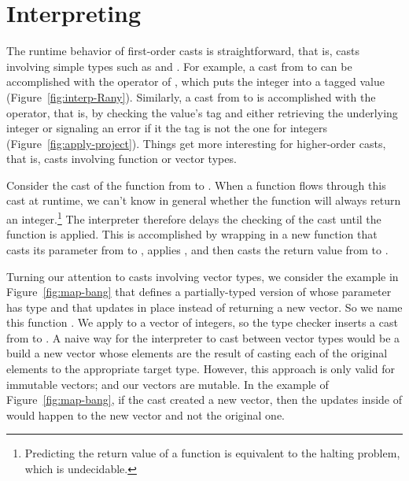 \documentclass[7x10]{TimesAPriori_MIT}%
\begin{document}
\clearpage

\section{Interpreting \LangCast{}}
\label{sec:interp-casts}

The runtime behavior of first-order casts is straightforward, that is,
casts involving simple types such as  and
.  For example, a cast from  to 
can be accomplished with the  operator of \LangAny{}, which
puts the integer into a tagged value
(Figure~\ref{fig:interp-Rany}). Similarly, a cast from  to
 is accomplished with the  operator, that
is, by checking the value's tag and either retrieving the underlying
integer or signaling an error if it the tag is not the one for
integers (Figure~\ref{fig:apply-project}).
%
Things get more interesting for higher-order casts, that is, casts
involving function or vector types.

Consider the cast of the function  from  to . When a function flows through
this cast at runtime, we can't know in general whether the function
will always return an integer.\footnote{Predicting the return value of
  a function is equivalent to the halting problem, which is
  undecidable.}  The \LangCast{} interpreter therefore delays the checking
of the cast until the function is applied. This is accomplished by
wrapping  in a new function that casts its parameter
from  to , applies , and then
casts the return value from  to .

Turning our attention to casts involving vector types, we consider the
example in Figure~\ref{fig:map-bang} that defines a
partially-typed version of  whose parameter  has
type  and that updates  in place
instead of returning a new vector. So we name this function
. We apply  to a vector of integers, so
the type checker inserts a cast from 
to . A naive way for the \LangCast{} interpreter to
cast between vector types would be a build a new vector whose elements
are the result of casting each of the original elements to the
appropriate target type. However, this approach is only valid for
immutable vectors; and our vectors are mutable. In the example of
Figure~\ref{fig:map-bang}, if the cast created a new vector, then
the updates inside of  would happen to the new vector
and not the original one.
\end{document}
